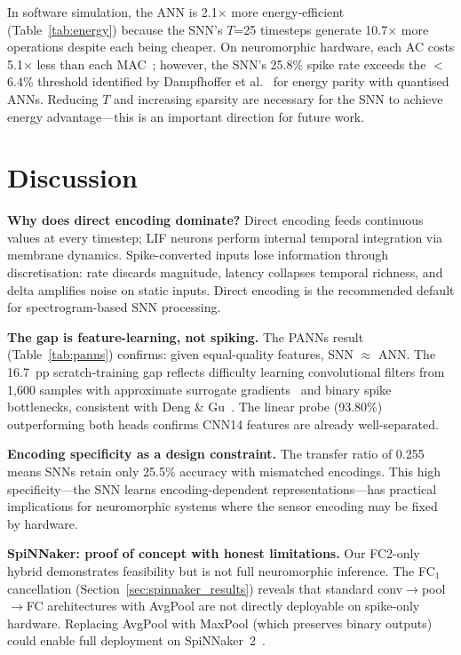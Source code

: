 \documentclass[sigconf,nonacm=false]{acmart}
\begin{document}
In software simulation, the ANN is 2.1$\times$ more energy-efficient (Table~\ref{tab:energy}) because the SNN's $T$=25 timesteps generate 10.7$\times$ more operations despite each being cheaper. On neuromorphic hardware, each AC costs 5.1$\times$ less than each MAC~\cite{horowitz2014}; however, the SNN's 25.8\% spike rate exceeds the $<$6.4\% threshold identified by Dampfhoffer et al.~\cite{dampfhoffer2023} for energy parity with quantised ANNs. Reducing $T$ and increasing sparsity are necessary for the SNN to achieve energy advantage---this is an important direction for future work.

\section{Discussion}
\label{sec:discussion}

\textbf{Why does direct encoding dominate?} Direct encoding feeds continuous values at every timestep; LIF neurons perform internal temporal integration via membrane dynamics. Spike-converted inputs lose information through discretisation: rate discards magnitude, latency collapses temporal richness, and delta amplifies noise on static inputs. Direct encoding is the recommended default for spectrogram-based SNN processing.

\textbf{The gap is feature-learning, not spiking.} The PANNs result (Table~\ref{tab:panns}) confirms: given equal-quality features, SNN $\approx$ ANN. The 16.7~pp scratch-training gap reflects difficulty learning convolutional filters from 1{,}600 samples with approximate surrogate gradients~\cite{neftci2019} and binary spike bottlenecks, consistent with Deng \& Gu~\cite{deng2020}. The linear probe (93.80\%) outperforming both heads confirms CNN14 features are already well-separated.

\textbf{Encoding specificity as a design constraint.} The transfer ratio of 0.255 means SNNs retain only 25.5\% accuracy with mismatched encodings. This high specificity---the SNN learns encoding-dependent representations---has practical implications for neuromorphic systems where the sensor encoding may be fixed by hardware.

\textbf{SpiNNaker: proof of concept with honest limitations.} Our FC2-only hybrid demonstrates feasibility but is not full neuromorphic inference. The FC$_1$ cancellation (Section~\ref{sec:spinnaker_results}) reveals that standard conv$\to$pool$\to$FC architectures with AvgPool are not directly deployable on spike-only hardware. Replacing AvgPool with MaxPool (which preserves binary outputs) could enable full deployment on SpiNNaker~2~\cite{hoppner2024}.
\end{document}
